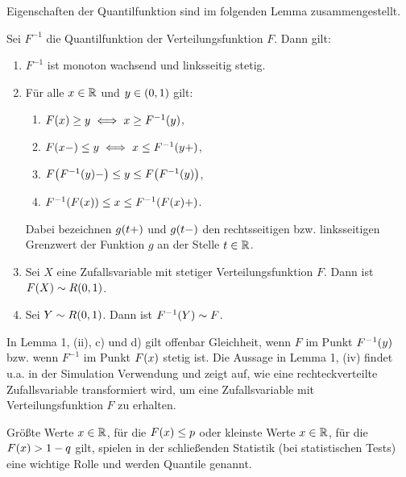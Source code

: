 \documentclass{lecture}
\begin{document}
    Eigenschaften der Quantilfunktion sind im folgenden Lemma zusammengestellt.

    \begin{lemma}
        Sei \(F^{-1}\) die Quantilfunktion der Verteilungsfunktion \(F\).
        Dann gilt:
        \begin{enumerate}
            \item \(F^{-1}\) ist monoton wachsend und linksseitig stetig.
            \item Für alle \(x \in \R\) und \(y \in \parentheses*{0, 1}\) gilt:
            \begin{enumerate}
                \item \(F\parentheses*{x} \ge y \iff x \ge F^{-1}\parentheses*{y}\),
                \item \(F\parentheses*{x-} \le y \iff x \le F^{-1}\parentheses*{y+}\),
                \item \(F\parentheses*{F^{-1}\parentheses*{y}-} \le y \le F\parentheses*{F^{-1}\parentheses*{y}}\),
                \item \(F^{-1}\parentheses*{F\parentheses*{x}} \le x \le F^{-1}\parentheses*{F\parentheses*{x}+}\).
            \end{enumerate}
            Dabei bezeichnen \(g\parentheses*{t+}\) und \(g\parentheses*{t-}\) den rechtsseitigen bzw. linksseitigen Grenzwert der Funktion \(g\) an der Stelle \(t \in \R\).
            \item Sei \(X\) eine Zufallsvariable mit stetiger Verteilungsfunktion \(F\).
            Dann ist \(F\parentheses*{X} \sim R\parentheses*{0, 1}\).
            \item Sei \(Y \sim R\parentheses*{0, 1}\).
            Dann ist \(F^{-1}\parentheses*{Y} \sim F\).
        \end{enumerate}
    \end{lemma}

    In Lemma 1, (ii), c) und d) gilt offenbar Gleichheit, wenn \(F\) im Punkt \(F^{-1}\parentheses*{y}\) bzw. wenn \(F^{-1}\) im Punkt \(F\parentheses*{x}\) stetig ist.
    Die Aussage in Lemma 1, (iv) findet u.a. in der Simulation Verwendung und zeigt auf, wie eine rechteckverteilte Zufallsvariable transformiert wird, um eine Zufallsvariable mit Verteilungsfunktion \(F\) zu erhalten.

    Größte Werte \(x \in \R\), für die \(F\parentheses*{x} \le p\) oder kleinste Werte \(x \in \R\), für die \(F\parentheses*{x} > 1 - q\) gilt, spielen in der schließenden Statistik (bei statistischen Tests) eine wichtige Rolle und werden Quantile genannt.
\end{document}
